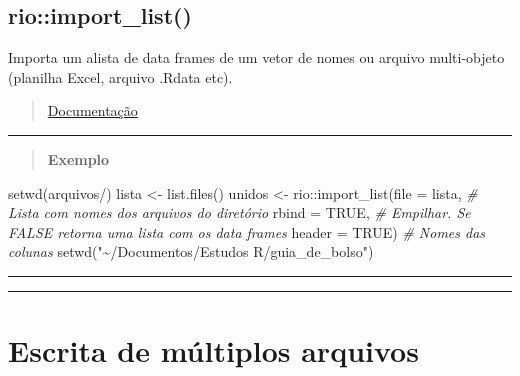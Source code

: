 \documentclass[
]{book}
\newenvironment{Shaded}{\begin{snugshade}}{\end{snugshade}}
\newcommand{\AttributeTok}[1]{\textcolor[rgb]{0.77,0.63,0.00}{#1}}
\newcommand{\CommentTok}[1]{\textcolor[rgb]{0.56,0.35,0.01}{\textit{#1}}}
\newcommand{\ConstantTok}[1]{\textcolor[rgb]{0.00,0.00,0.00}{#1}}
\newcommand{\FunctionTok}[1]{\textcolor[rgb]{0.00,0.00,0.00}{#1}}
\newcommand{\NormalTok}[1]{#1}
\newcommand{\OtherTok}[1]{\textcolor[rgb]{0.56,0.35,0.01}{#1}}
\newcommand{\SpecialCharTok}[1]{\textcolor[rgb]{0.00,0.00,0.00}{#1}}
\newcommand{\StringTok}[1]{\textcolor[rgb]{0.31,0.60,0.02}{#1}}
\theoremstyle{definition}
\theoremstyle{definition}
\theoremstyle{definition}
\theoremstyle{definition}
\theoremstyle{remark}
\begin{document}
\hypertarget{rioimport_list}{%
\subsection{rio::import\_list()}\label{rioimport_list}}

Importa um alista de data frames de um vetor de nomes ou arquivo multi-objeto (planilha Excel, arquivo .Rdata etc).

\begin{quote}
\href{https://www.rdocumentation.org/packages/rio/versions/0.5.29/topics/import_list}{Documentação}
\end{quote}

\begin{center}\rule{0.5\linewidth}{0.5pt}\end{center}

\begin{quote}
\textbf{Exemplo}
\end{quote}

\begin{Shaded}
\begin{Highlighting}[]
\FunctionTok{setwd}\NormalTok{(}\StringTok{\textquotesingle{}arquivos/\textquotesingle{}}\NormalTok{)}
\NormalTok{lista }\OtherTok{\textless{}{-}} \FunctionTok{list.files}\NormalTok{()}
\NormalTok{unidos }\OtherTok{\textless{}{-}}\NormalTok{ rio}\SpecialCharTok{::}\FunctionTok{import\_list}\NormalTok{(}\AttributeTok{file =}\NormalTok{ lista, }\CommentTok{\# Lista com nomes dos arquivos do diretório}
                 \AttributeTok{rbind =} \ConstantTok{TRUE}\NormalTok{,    }\CommentTok{\# Empilhar. Se FALSE retorna uma lista com os data frames}
                 \AttributeTok{header =} \ConstantTok{TRUE}\NormalTok{)   }\CommentTok{\# Nomes das colunas}
\FunctionTok{setwd}\NormalTok{(}\StringTok{"\textasciitilde{}/Documentos/Estudos R/guia\_de\_bolso"}\NormalTok{)}
\end{Highlighting}
\end{Shaded}

\begin{center}\rule{0.5\linewidth}{0.5pt}\end{center}

\begin{center}\rule{0.5\linewidth}{0.5pt}\end{center}

\hypertarget{escrita-de-muxfaltiplos-arquivos}{%
\section{Escrita de múltiplos arquivos}\label{escrita-de-muxfaltiplos-arquivos}}
\end{document}
